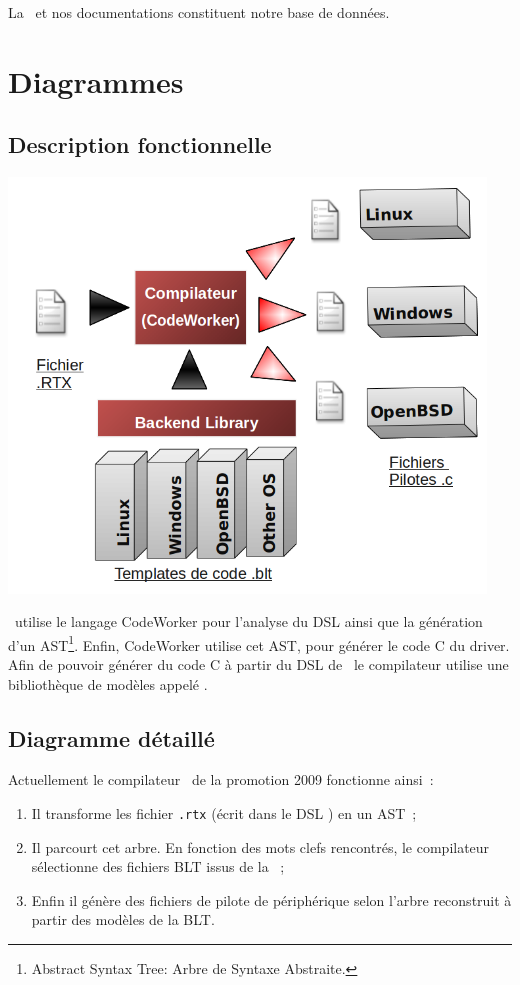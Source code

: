 \documentclass{rtxreport}
\begin{document}
La \BL\ et nos documentations constituent notre base de données.

\chapter{Diagrammes}

\section{Description fonctionnelle}

\includegraphics[width=0.95\textwidth]{diagramme_general}

\rtx\ utilise le langage CodeWorker\cite{CodeWorker} pour l'analyse du DSL ainsi
que la génération d'un AST\footnote{Abstract Syntax Tree: Arbre de Syntaxe
Abstraite.}. Enfin, CodeWorker utilise cet AST, pour générer le code C du
driver. Afin de pouvoir générer du code C à partir du DSL de \rtx\, le
compilateur utilise une bibliothèque de modèles appelé \BL.

\section{Diagramme détaillé}

Actuellement le compilateur \rtx\ de la promotion 2009 fonctionne ainsi~:
\begin{enumerate}
\item Il transforme les fichier \texttt{.rtx} (écrit dans le DSL \rtx) en un AST~;
\item Il parcourt cet arbre. En fonction des mots clefs rencontrés, le
compilateur sélectionne des fichiers BLT issus de la \BL~;
\item Enfin il génère des fichiers de pilote de périphérique selon l'arbre
reconstruit à partir des modèles de la BLT.
\end{enumerate}
\end{document}
